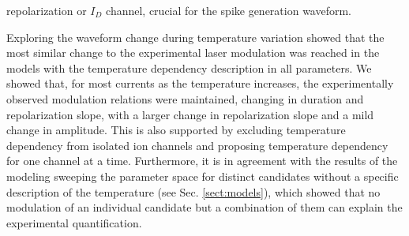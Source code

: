 repolarization or $I_{D}$ channel, crucial for the spike generation waveform.


Exploring the waveform change during temperature variation showed that the most similar change to the experimental laser modulation was reached in the models with the temperature dependency description in all parameters. We showed that, for most currents as the temperature increases, the experimentally observed modulation relations were maintained, changing in duration and repolarization slope, with a larger change in repolarization slope and a mild change in amplitude. This is also supported by excluding temperature dependency from isolated ion channels and proposing temperature dependency for one channel at a time. Furthermore, it is in agreement with the results of the modeling sweeping the parameter space for distinct candidates without a specific description of the temperature (see Sec. \ref{sect:models}), which showed that no modulation of an individual candidate but a combination of them can explain the experimental quantification.

